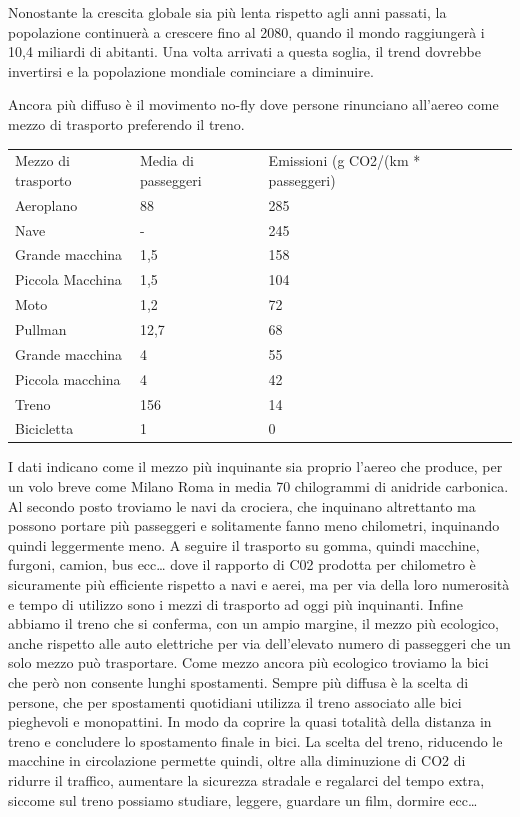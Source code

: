 \documentclass[12pt]{book} %
\begin{document}
Nonostante la crescita globale sia più lenta rispetto agli anni passati, la popolazione continuerà a crescere fino al
2080, quando il mondo raggiungerà i 10,4 miliardi di abitanti. Una volta arrivati a questa soglia, il trend dovrebbe
invertirsi e la popolazione mondiale cominciare a diminuire.

Ancora più diffuso è il movimento no-fly dove persone rinunciano all'aereo come mezzo di trasporto
preferendo il treno.


\bigskip

\begin{table}[]
\begin{tabular}{lllll}
Mezzo di trasporto & Media di passeggeri & Emissioni (g CO2/(km * passeggeri) & & \\
Aeroplano & 88 & 285 & & \\
Nave & - & 245 & & \\
Grande macchina & 1,5 & 158 & & \\
Piccola Macchina & 1,5 & 104 & & \\
Moto & 1,2 & 72 & & \\
Pullman & 12,7 & 68 & & \\
Grande macchina & 4 & 55 & & \\
Piccola macchina & 4 & 42 & & \\
Treno & 156 & 14 & & \\
Bicicletta & 1 & 0 & & 
\end{tabular}
\end{table}

\bigskip

I dati indicano come il mezzo più
inquinante sia proprio l'aereo che produce, per un volo breve come Milano Roma in media 70
chilogrammi di anidride carbonica. Al secondo posto troviamo le navi da crociera, che inquinano altrettanto ma possono
portare più passeggeri e solitamente fanno meno chilometri, inquinando quindi leggermente meno. A seguire il trasporto
su gomma, quindi macchine, furgoni, camion, bus ecc… dove il rapporto di C02 prodotta per chilometro è sicuramente più
efficiente rispetto a navi e aerei, ma per via della loro numerosità e tempo di utilizzo sono i mezzi di trasporto ad
oggi più inquinanti. Infine abbiamo il treno che si conferma, con un ampio margine, il mezzo più ecologico, anche
rispetto alle auto elettriche per via dell'elevato numero di passeggeri che un solo mezzo può
trasportare. Come mezzo ancora più ecologico troviamo la bici che però non consente lunghi spostamenti. Sempre più
diffusa è la scelta di persone, che per spostamenti quotidiani utilizza il treno associato alle bici pieghevoli e
monopattini. In modo da coprire la quasi totalità della distanza in treno e concludere lo spostamento finale in bici.
La scelta del treno, riducendo le macchine in circolazione permette quindi, oltre alla diminuzione di CO2 di ridurre il
traffico, aumentare la sicurezza stradale e regalarci del tempo extra, siccome sul treno possiamo studiare, leggere,
guardare un film, dormire ecc…
\end{document}
